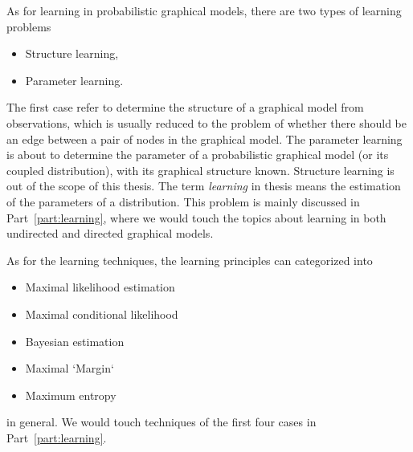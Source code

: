 As for learning in probabilistic graphical models, there are two types of learning problems
\begin{itemize}
\item Structure learning,
\item Parameter learning.
\end{itemize}
The first case refer to determine the structure of a graphical model from observations, which is usually reduced to the problem of whether there should be an edge between a pair of nodes in the graphical model. The parameter learning is about to determine the parameter of a probabilistic graphical model (or its coupled distribution), with its graphical structure known. Structure learning is out of the scope of this thesis. The term \textit{learning} in thesis means the estimation of the parameters of a distribution. This problem is mainly discussed in Part~\ref{part:learning}, where we would touch the topics about learning in both undirected and directed graphical models. 


As for the learning techniques, the learning principles can categorized into
\begin{itemize}
\item Maximal likelihood estimation
\item Maximal conditional likelihood
\item Bayesian estimation
\item Maximal `Margin`
\item Maximum entropy
\end{itemize}
in general. We would touch techniques of the first four cases in Part~\ref{part:learning}.

